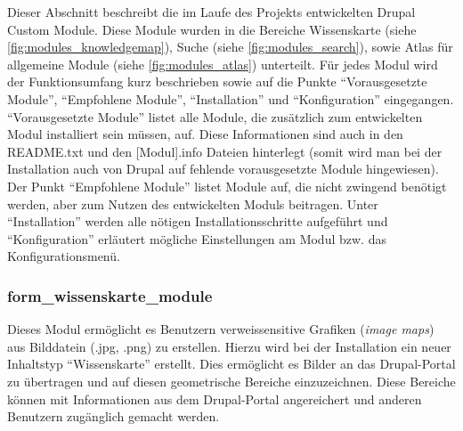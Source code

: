 Dieser Abschnitt beschreibt die im Laufe des Projekts entwickelten Drupal Custom Module. Diese Module wurden in die Bereiche Wissenskarte (siehe \cref{fig:modules_knowledgemap}), Suche (siehe \cref{fig:modules_search}), sowie Atlas für allgemeine Module (siehe \cref{fig:modules_atlas}) unterteilt.
Für jedes Modul wird der Funktionsumfang kurz beschrieben sowie auf die Punkte \enquote{Vorausgesetzte Module}, \enquote{Empfohlene Module}, \enquote{Installation} und \enquote{Konfiguration} eingegangen. \enquote{Vorausgesetzte Module} listet alle Module, die zusätzlich zum entwickelten Modul installiert sein müssen, auf. Diese Informationen sind auch in den README.txt und den [Modul].info Dateien hinterlegt (somit wird man bei der Installation auch von Drupal auf fehlende vorausgesetzte Module hingewiesen). Der Punkt \enquote{Empfohlene Module} listet Module auf, die nicht zwingend benötigt werden, aber zum Nutzen des entwickelten Moduls beitragen. Unter \enquote{Installation} werden alle nötigen Installationsschritte aufgeführt und \enquote{Konfiguration} erläutert mögliche Einstellungen am Modul bzw. das Konfigurationsmenü.






\newpage
\subsubsection{form\_wissenskarte\_module}\label{subsub:form_wissenskarte_module}
Dieses Modul ermöglicht es Benutzern verweissensitive Grafiken (\textit{image maps}) aus Bilddatein (.jpg, .png) zu erstellen. Hierzu wird bei der Installation ein neuer Inhaltstyp \enquote{Wissenskarte} erstellt. Dies ermöglicht es Bilder an das Drupal-Portal zu übertragen und auf diesen geometrische Bereiche einzuzeichnen. Diese Bereiche können mit Informationen aus dem Drupal-Portal angereichert und anderen Benutzern zugänglich gemacht werden.

